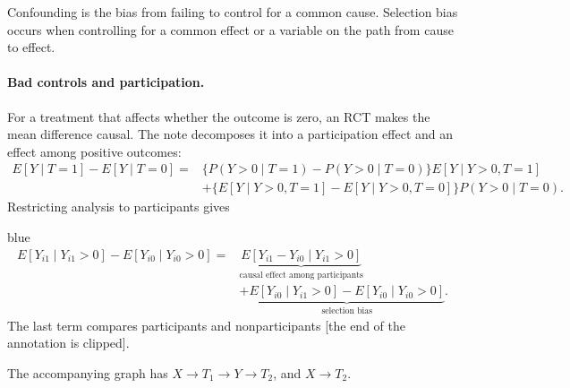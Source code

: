 {Confounding is the bias from failing to control for a common cause. Selection bias occurs when controlling for a common effect or a variable on the path from cause to effect.

\paragraph{Bad controls and participation.}
For a treatment that affects whether the outcome is zero, an RCT makes the mean difference causal. The note decomposes it into a participation effect and an effect among positive outcomes:
\begin{align*}
E[Y\mid T=1]-E[Y\mid T=0]
={}&\{P(Y>0\mid T=1)-P(Y>0\mid T=0)\}E[Y\mid Y>0,T=1]\\
&+\{E[Y\mid Y>0,T=1]-E[Y\mid Y>0,T=0]\}P(Y>0\mid T=0).
\end{align*}
 Restricting analysis to participants gives
\begin{inkblock}{blue}
\begin{align*}
E[Y_{i1}\mid Y_{i1}>0]-E[Y_{i0}\mid Y_{i0}>0]
={}&\underbrace{E[Y_{i1}-Y_{i0}\mid Y_{i1}>0]}_{\text{causal effect among participants}}\\
&+\underbrace{E[Y_{i0}\mid Y_{i1}>0]-E[Y_{i0}\mid Y_{i0}>0]}_{\text{selection bias}}.
\end{align*}
The last term compares participants and nonparticipants [the end of the annotation is clipped]. \end{inkblock}
The accompanying graph has $X\to T_1\to Y\to T_2$, and $X\to T_2$. 

\begin{center}
\end{center}}
